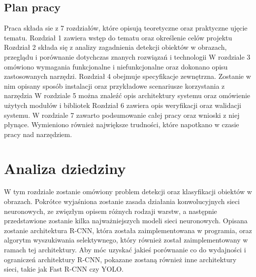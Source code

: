 \documentclass[a4paper,twoside,12pt]{book}
\begin{document}
\section{Plan pracy}
{Praca składa sie z 7 rozdziałów, które opisują teoretyczne oraz praktyczne ujęcie tematu.}
{Rozdział 1 zawiera wstęp do tematu oraz określenie celów projektu}
{Rozdział 2 składa się z analizy zagadnienia detekcji obiektów w obrazach, przeglądu i porównanie dotychczas znanych rozwiązań i technologii}
{W rozdziale 3 omówiono wymagania funkcjonalne i niefunkcjonalne oraz dokonano opisu zastosowanych narzędzi.}
{Rozdział 4 obejmuje specyfikacje zewnętrzna. Zostanie w nim opisany sposób instalacji oraz przykładowe scenariusze korzystania z narzędzia }
{W rozdziale 5 można znaleźć opis architektury systemu oraz omówienie użytych modułów i bibliotek}
{Rozdział 6 zawiera opis weryfikacji oraz walidacji systemu.}
{W rozdziale 7 zawarto podsumowanie całej pracy oraz wnioski z niej płynące. Wymieniono również największe trudności, które napotkano w czasie pracy nad narzędziem.}


\chapter{Analiza dziedziny}
{W tym rozdziale zostanie omówiony problem detekcji oraz klasyfikacji obiektów w obrazach. Pokrótce wyjaśniona zostanie zasada działania konwolucyjnych sieci neuronowych, ze zwięzłym opisem różnych rodzaji warstw, a następnie przedstawione zostanie kilka najważniejszych modeli sieci neuronowych. Opisana zostanie architektura R-CNN, która została zaimplementowana w programia, oraz algorytm wyszukiwania selektywnego, który również został zaimplementowany w ramach tej architektury. Aby móc uzyskać jakieś porównanie co do wydajności i ograniczeń architektury R-CNN,  pokazane zostaną również inne architektury sieci, takie jak Fast R-CNN czy YOLO.}
\end{document}
